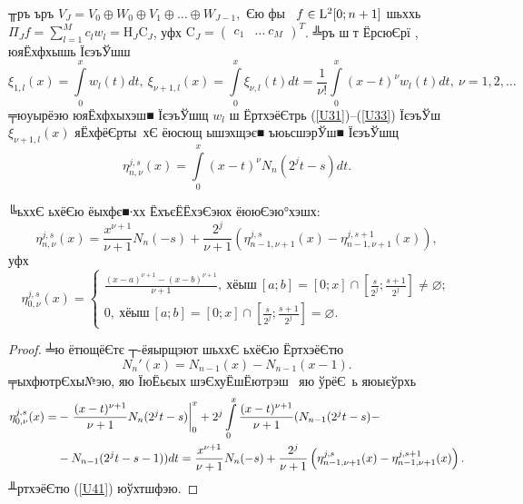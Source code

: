\documentclass[12pt, a4paper, oneside]{article}
\begin{document}
╥ръ ъръ $V_{J}=V_0\oplus W_0\oplus V_1\oplus\dots\oplus W_{J-1},$ Єю фы  $f\in {\rm L}^2[0;n+1]$ шьххь
$\Pi_{J} f=\sum\limits_{l=1}^{M} c_l w_l = \mathrm{H}_{J}\mathrm{C}_{J}$,
уфх $\mathrm{C}_J=\begin{pmatrix} c_1 & \dots\ c_{M} \end{pmatrix}^T$.
╩ръ ш т ЁрсюЄрї \cite{Lepik1, Lepik2, Lepik3, Lepik4, Lepik}, юяЁхфхышь ЇєэъЎшш
\begin{equation}\label{U38}
{\xi}_{1,l}(x)=\int\limits_0^x w_l (t)dt,~
{\xi}_{\nu+1,l}(x)=\int\limits_0^x {\xi}_{\nu,l}(t)dt=\frac{1}{\nu !}\int\limits_0^x (x-t)^{\nu} w_l (t)dt,~\nu = 1,2,\dots
\end{equation}
╤юуырёэю юяЁхфхыхэш■ ЇєэъЎшщ $w_l$ ш ЁртхэёЄтрь (\ref{U31})--(\ref{U33})  ЇєэъЎш  ${\xi}_{\nu+1,l}(x)$ яЁхфёЄрты хЄ ёюсющ ышэхщэє■ ъюьсшэрЎш■ ЇєэъЎшщ
\[
\eta_{n,\nu}^{j,s}(x)=\int\limits_0^x (x-t)^{\nu} N_{n}(2^j t-s)dt.
\]
\begin{Lem} ╚ьххЄ ьхёЄю ёыхфє■∙хх ЁхъєЁЁхэЄэюх ёююЄэю°хэшх:
\begin{equation}\label{U40}
\eta_{n,\nu}^{j,s}(x)=\frac{x^{\nu+1}}{\nu+1} N_n(-s)+\frac{2^j}{\nu+1}\left(\eta_{n-1,\nu+1}^{j,s}(x)-\eta_{n-1,\nu+1}^{j,s+1}(x)\right),
\end{equation}
уфх
\begin{equation}\label{U41}
\eta_{0,\nu}^{j,s}(x) = \begin{cases}\frac{(x-a)^{\nu+1} - (x-b)^{\nu+1}}{\nu+1},~\text{хёыш}~[a;b]=[0;x]\cap\left[\frac{s}{2^j};\frac{s+1}{2^j}\right]\not= \varnothing;\\ 0,~\text{хёыш}~[a;b]=[0;x]\cap\left[\frac{s}{2^j};\frac{s+1}{2^j}\right]= \varnothing.\end{cases}
\end{equation}
\end{Lem}
\begin{proof} ╧ю ётющёЄтє ┬-ёяырщэют \cite{Chui}  шьххЄ ьхёЄю ЁртхэёЄтю
\begin{equation}\label{BSPL}
N_n'(x)=N_{n-1}(x)-N_{n-1}(x-1).
\end{equation}
╤ыхфютрЄхы№эю, яю ЇюЁьєых шэЄхуЁшЁютрэш  яю ўрёЄ ь  яюыєўрхь
\begin{align}
\eta_{0,\nu}^{j,s}(x)=&-\left. \frac{(x-t)^{\nu+1}}{\nu+1} N_n(2^j t-s)\right|_0^x+2^j\int\limits_0^x \frac{(x-t)^{\nu+1}}{\nu+1} (N_{n-1}(2^jt-s)-\notag\\
&-N_{n-1}(2^jt-s-1))dt=\frac{x^{\nu+1}}{\nu+1} N_n(-s)+\frac{2^j}{\nu+1}\left(\eta_{n-1,\nu+1}^{j,s}(x)-\eta_{n-1,\nu+1}^{j,s+1}(x)\right).\notag
\end{align}
╨ртхэёЄтю (\ref{U41}) юўхтшфэю.
\end{proof}
\end{document}
